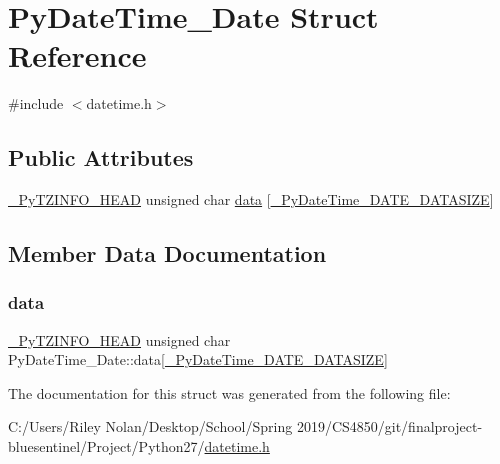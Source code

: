 \hypertarget{struct_py_date_time___date}{}\section{Py\+Date\+Time\+\_\+\+Date Struct Reference}
\label{struct_py_date_time___date}


{\ttfamily \#include $<$datetime.\+h$>$}

\subsection*{Public Attributes}
\begin{DoxyCompactItemize}
\item 
\mbox{\hyperlink{datetime_8h_ae994bac5989fb22f9e704dd1661fdf9c}{\+\_\+\+Py\+T\+Z\+I\+N\+F\+O\+\_\+\+H\+E\+AD}} unsigned char \mbox{\hyperlink{struct_py_date_time___date_ab9c69c1645e8c6db8fd199110bb95b66}{data}} \mbox{[}\mbox{\hyperlink{datetime_8h_a5bfa01cfa7497f2b7f327492f9f55eb6}{\+\_\+\+Py\+Date\+Time\+\_\+\+D\+A\+T\+E\+\_\+\+D\+A\+T\+A\+S\+I\+ZE}}\mbox{]}
\end{DoxyCompactItemize}


\subsection{Member Data Documentation}
\mbox{\label{struct_py_date_time___date_ab9c69c1645e8c6db8fd199110bb95b66}} 
\subsubsection{\texorpdfstring{data}{data}}
{\footnotesize\ttfamily \mbox{\hyperlink{datetime_8h_ae994bac5989fb22f9e704dd1661fdf9c}{\+\_\+\+Py\+T\+Z\+I\+N\+F\+O\+\_\+\+H\+E\+AD}} unsigned char Py\+Date\+Time\+\_\+\+Date\+::data\mbox{[}\mbox{\hyperlink{datetime_8h_a5bfa01cfa7497f2b7f327492f9f55eb6}{\+\_\+\+Py\+Date\+Time\+\_\+\+D\+A\+T\+E\+\_\+\+D\+A\+T\+A\+S\+I\+ZE}}\mbox{]}}



The documentation for this struct was generated from the following file\+:\begin{DoxyCompactItemize}
\item 
C\+:/\+Users/\+Riley Nolan/\+Desktop/\+School/\+Spring 2019/\+C\+S4850/git/finalproject-\/bluesentinel/\+Project/\+Python27/\mbox{\hyperlink{datetime_8h}{datetime.\+h}}\end{DoxyCompactItemize}
